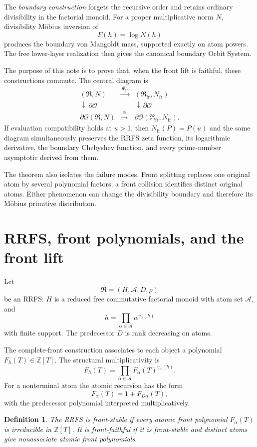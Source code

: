 \documentclass[11pt]{article}
\newcommand{\ZZ}{\mathbb Z}
\newcommand{\cR}{\mathfrak R}
\newcommand{\cA}{\mathcal A}
\newcommand{\cO}{\mathcal O}
\newcommand{\fr}{\mathrm{fr}}
\newcommand{\bd}{\partial}
\newtheorem{definition}[theorem]{Definition}
\begin{document}
The \emph{boundary construction} forgets the recursive order and retains ordinary divisibility in the factorial monoid. For a proper multiplicative norm $N$, divisibility M\"obius inversion of
\[
F(h)=\log N(h)
\]
produces the boundary von Mangoldt mass, supported exactly on atom powers. The free lower-layer realization then gives the canonical boundary Orbit System.

The purpose of this note is to prove that, when the front lift is faithful, these constructions commute. The central diagram is
\[
\boxed{
\begin{array}{ccc}
(\cR,N)&\xrightarrow{\ \Phi_{\fr}\ }&(\cR_{\fr},N_{\fr})\\[2mm]
\downarrow\,\bd\cO&&\downarrow\,\bd\cO\\[2mm]
\bd\cO(\cR,N)&\xrightarrow{\ \cong\ }&
\bd\cO(\cR_{\fr},N_{\fr}).
\end{array}}
\]
If evaluation compatibility holds at $u>1$, then $N_{\fr}(P)=P(u)$ and the same diagram simultaneously preserves the RRFS zeta function, its logarithmic derivative, the boundary Chebyshev function, and every prime-number asymptotic derived from them.

The theorem also isolates the failure modes. Front splitting replaces one original atom by several polynomial factors; a front collision identifies distinct original atoms. Either phenomenon can change the divisibility boundary and therefore its M\"obius primitive distribution.

\section{RRFS, front polynomials, and the front lift}

Let
\[
\cR=(H,\cA,D,\rho)
\]
be an RRFS: $H$ is a reduced free commutative factorial monoid with atom set $\cA$, and
\[
h=\prod_{\alpha\in\cA}\alpha^{v_\alpha(h)}
\]
with finite support. The predecessor $D$ is rank decreasing on atoms.

The complete-front construction associates to each object a polynomial $F_h(T)\in\ZZ[T]$. The structural multiplicativity is
\begin{equation}\label{eq:frontmult}
F_h(T)=\prod_{\alpha\in\cA}F_\alpha(T)^{v_\alpha(h)}.
\end{equation}
For a nonterminal atom the atomic recursion has the form
\[
F_\alpha(T)=1+F_{D\alpha}(T),
\]
with the predecessor polynomial interpreted multiplicatively.

\begin{definition}
The RRFS is \emph{front-stable} if every atomic front polynomial $F_\alpha(T)$ is irreducible in $\ZZ[T]$. It is \emph{front-faithful} if it is front-stable and distinct atoms give nonassociate atomic front polynomials.
\end{definition}
\end{document}
